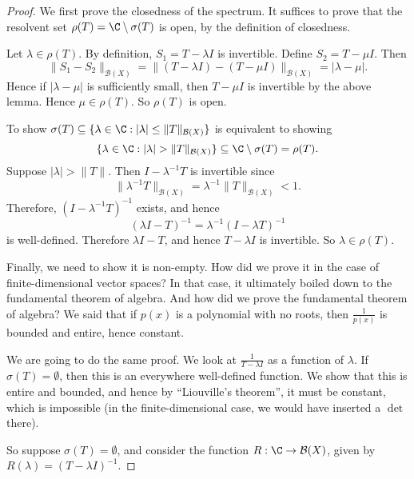 \documentclass[a4paper]{article}
\begin{document}
\begin{proof}
  We first prove the closedness of the spectrum. It suffices to prove that the resolvent set $\rho(T) = \C \setminus \sigma(T)$ is open, by the definition of closedness.

  Let $\lambda \in \rho(T)$. By definition, $S_1 = T - \lambda I$ is invertible. Define $S_2 = T - \mu I$. Then
  \[
    \|S_1 - S_2\|_{\mathcal{B}(X)} = \|(T - \lambda I) - (T - \mu I)\|_{\mathcal{B}(X)} = |\lambda - \mu|.
  \]
  Hence if $|\lambda - \mu|$ is sufficiently small, then $T - \mu I$ is invertible by the above lemma. Hence $\mu \in \rho(T)$. So $\rho(T)$ is open.

  To show $\sigma(T) \subseteq \{\lambda \in \C: |\lambda| \leq \|T\|_{\mathcal{B}(X)}\}$ is equivalent to showing
  \[
    \{\lambda \in \C: |\lambda| > \|T\|_{\mathcal{B}(X)}\} \subseteq \C \setminus \sigma(T) = \rho(T).
  \]
  Suppose $|\lambda| > \|T\|$. Then $I - \lambda^{-1} T$ is invertible since
  \[
    \|\lambda^{-1} T\|_{\mathcal{B}(X)} = \lambda^{-1} \|T\|_{\mathcal{B}(X)} < 1.
  \]
  Therefore, $(I - \lambda^{-1} T)^{-1}$ exists, and hence
  \[
    (\lambda I - T)^{-1} = \lambda^{-1} (I - \lambda T)^{-1}
  \]
  is well-defined. Therefore $\lambda I - T$, and hence $T - \lambda I$ is invertible. So $\lambda \in \rho(T)$.

  Finally, we need to show it is non-empty. How did we prove it in the case of finite-dimensional vector spaces? In that case, it ultimately boiled down to the fundamental theorem of algebra. And how did we prove the fundamental theorem of algebra? We said that if $p(x)$ is a polynomial with no roots, then $\frac{1}{p(x)}$ is bounded and entire, hence constant.

  We are going to do the same proof. We look at $\frac{1}{T - \lambda I}$ as a function of $\lambda$. If $\sigma(T) = \emptyset$, then this is an everywhere well-defined function. We show that this is entire and bounded, and hence by ``Liouville's theorem'', it must be constant, which is impossible (in the finite-dimensional case, we would have inserted a $\det$ there).

  So suppose $\sigma(T) = \emptyset$, and consider the function $R: \C \to \mathcal{B}(X)$, given by $R(\lambda) = (T - \lambda I)^{-1}$.


\end{proof}
\end{document}

